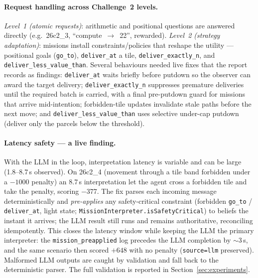 \paragraph{Request handling across Challenge~2 levels.} \emph{Level~1 (atomic
requests)}: arithmetic and positional questions are answered directly
(e.g.\ 26c2\_3, ``compute~$\to$~22'', rewarded). \emph{Level~2 (strategy
adaptation)}: missions install constraints/policies that reshape the utility ---
positional goals (\texttt{go\_to}), \texttt{deliver\_at} a tile,
\texttt{deliver\_exactly\_n}, and \texttt{deliver\_less\_value\_than}. Several
behaviours needed live fixes that the report records as findings:
\texttt{deliver\_at} waits briefly before putdown so the observer can award the
target delivery; \texttt{deliver\_exactly\_n} suppresses premature deliveries
until the required batch is carried, with a final pre-putdown guard for missions
that arrive mid-intention; forbidden-tile updates invalidate stale paths before
the next move; and \texttt{deliver\_less\_value\_than} uses selective under-cap
putdown (deliver only the parcels below the threshold).

\paragraph{Latency safety --- a live finding.} With the LLM in the loop,
interpretation latency is variable and can be large (1.8--8.7\,s observed). On
26c2\_4 (movement through a tile band forbidden under a $-1000$ penalty) an
8.7\,s interpretation let the agent cross a forbidden tile and take the penalty,
scoring $-377$. The fix parses each incoming message deterministically and
\emph{pre-applies} any safety-critical constraint (forbidden \texttt{go\_to} /
\texttt{deliver\_at}, light state; \texttt{MissionInterpreter.isSafetyCritical})
to beliefs the instant it arrives; the LLM result still runs and remains
authoritative, reconciling idempotently. This closes the latency window while
keeping the LLM the primary interpreter: the \texttt{mission\_preapplied} log
precedes the LLM completion by $\sim$3\,s, and the same scenario then scored
$+648$ with no penalty (\texttt{source=llm} preserved). Malformed LLM outputs
are caught by validation and fall back to the deterministic parser. The full
validation is reported in Section~\ref{sec:experiments}.
